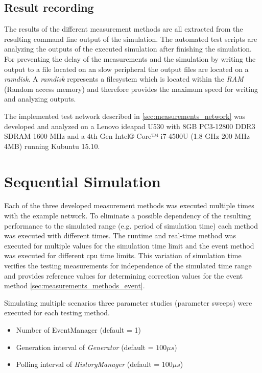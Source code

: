 \subsection{Result recording}
The results of the different measurement methods are all extracted from the resulting command line output of the simulation.
The automated test scripts are analyzing the outputs of the executed simulation after finishing the simulation.
For preventing the delay of the measurements and the simulation by writing the output to a file located on an slow peripheral the output files are located on a \emph{ramdisk}.
A \emph{ramdisk} represents a filesystem which is located within the \emph{RAM} (Random access memory) and therefore provides the maximum speed for writing and analyzing outputs.

The implemented test network described in \ref{sec:measurements_network} was developed and analyzed on a Lenovo ideapad U530 with 8GB PC3-12800 DDR3 SDRAM 1600 MHz and a 4th Gen Intel® Core™ i7-4500U (1.8 GHz 200 MHz 4MB) running Kubuntu 15.10.
\cite{lenovo_spec}

\section{Sequential Simulation}
\label{sec:measurements_sequential}
Each of the three developed measurement methods was executed multiple times with the example network.
To eliminate a possible dependency of the resulting performance to the simulated range (e.g. period of simulation time) each method was executed with different times.
The runtime and real-time method was executed for multiple values for the simulation time limit and the event method was executed for different cpu time limits.
This variation of simulation time verifies the testing measurements for independence of the simulated time range and provides reference values for determining correction values for the event method \ref{sec:measurements_methods_event}.

Simulating multiple scenarios three parameter studies (parameter sweeps) were executed for each testing method.

\begin{itemize}
    \item Number of EventManager (default = 1)
    \item Generation interval of \emph{Generator} (default = $100\mu s$)
    \item Polling interval of \emph{HistoryManager} (default = $100\mu s$)
\end{itemize}

